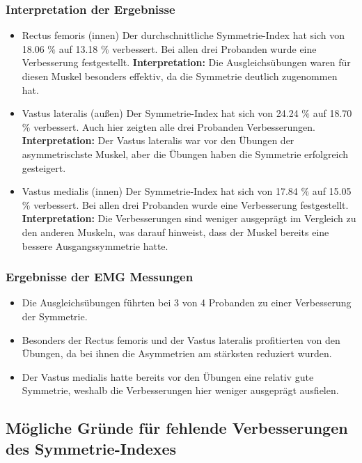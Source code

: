 \subsubsection{Interpretation der Ergebnisse}
\begin{itemize}
    \item Rectus femoris (innen)
    Der durchschnittliche Symmetrie-Index hat sich von 18.06 $\%$ auf 13.18 $\%$ verbessert.
    Bei allen drei Probanden wurde eine Verbesserung festgestellt.
    \textbf{Interpretation:} Die Ausgleichsübungen waren für diesen Muskel besonders effektiv, da die Symmetrie deutlich zugenommen hat.
    \item Vastus lateralis (außen)
    Der Symmetrie-Index hat sich von 24.24 $\%$ auf 18.70 $\%$ verbessert.
    Auch hier zeigten alle drei Probanden Verbesserungen.
    \textbf{Interpretation:} Der Vastus lateralis war vor den Übungen der asymmetrischste Muskel, aber die Übungen haben die Symmetrie erfolgreich gesteigert.
    \item Vastus medialis (innen)
    Der Symmetrie-Index hat sich von 17.84 $\%$ auf 15.05 $\%$ verbessert.
    Bei allen drei Probanden wurde eine Verbesserung festgestellt.
    \textbf{Interpretation:} Die Verbesserungen sind weniger ausgeprägt im Vergleich zu den anderen Muskeln, was darauf hinweist, dass der Muskel bereits eine bessere Ausgangssymmetrie hatte.
\end{itemize}

\subsubsection{Ergebnisse der EMG Messungen}
\begin{itemize}
    \item Die Ausgleichsübungen führten bei 3 von 4 Probanden zu einer Verbesserung der Symmetrie.
    \item Besonders der Rectus femoris und der Vastus lateralis profitierten von den Übungen, da bei ihnen die Asymmetrien am stärksten reduziert wurden.
    \item Der Vastus medialis hatte bereits vor den Übungen eine relativ gute Symmetrie, weshalb die Verbesserungen hier weniger ausgeprägt ausfielen.
\end{itemize}

\subsection{Mögliche Gründe für fehlende Verbesserungen des Symmetrie-Indexes}

